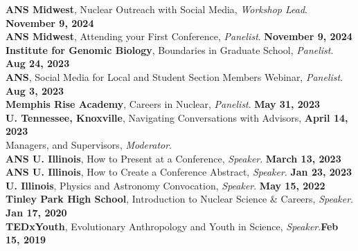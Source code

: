 \documentclass[margin,line]{resume}
\begin{document}
\begin{resume}
    \textbf{ANS Midwest}, Nuclear Outreach with Social Media, \emph{Workshop Lead}.  \hfill\textbf{November 9, 2024}\\
    \textbf{ANS Midwest}, Attending your First Conference, \emph{Panelist}.  \hfill\textbf{November 9, 2024}\\
    \textbf{Institute for Genomic Biology}, Boundaries in Graduate School, \emph{Panelist}. \hfill \textbf{Aug 24, 2023}\\
    \textbf{ANS}, Social Media for Local and Student Section Members Webinar, \emph{Panelist}. \hfill\textbf{Aug 3, 2023}\\
    \textbf{Memphis Rise Academy}, Careers in Nuclear, \emph{Panelist}. \hfill\textbf{May 31, 2023}\\
    \textbf{U. Tennessee, Knoxville}, Navigating Conversations with Advisors,  \hfill\textbf{April 14, 2023}\\
    Managers, and Supervisors, \emph{Moderator}.\\
    \textbf{ANS U. Illinois}, How to Present at a Conference, \emph{Speaker}.  \hfill\textbf{March 13, 2023}\\
    \textbf{ANS U. Illinois}, How to Create a Conference Abstract, \emph{Speaker}.  \hfill\textbf{Jan 23, 2023}\\
    \textbf{U. Illinois}, Physics and Astronomy Convocation, \emph{Speaker}.  \hfill\textbf{May 15, 2022}\\
    \textbf{Tinley Park High School}, Introduction to Nuclear Science \& Careers, \emph{Speaker}.  \hfill\textbf{Jan 17, 2020}\\
    \textbf{TEDxYouth}, Evolutionary Anthropology and Youth in Science, \emph{Speaker}.\hfill\textbf{Feb 15, 2019}\\



\end{resume}
\end{document}
